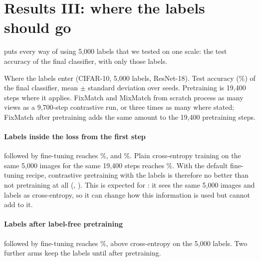 \section{Results III: where the labels should go}
\label{sec:where}

 puts every way of using 5,000 labels that we tested on one scale: the test accuracy of the
final classifier, with only those labels.

\begin{table}[t]
\centering
\small
\caption{Where the labels enter (CIFAR-10, 5,000 labels, ResNet-18). Test accuracy (\%) of the final
classifier, mean $\pm$ standard deviation over seeds. Pretraining is 19,400 steps where it applies.
FixMatch and MixMatch from scratch process as many views as a 9,700-step contrastive run, or three times as
many where stated; FixMatch after pretraining adds the same amount to the 19,400 pretraining steps.}
\label{tab:where}
\begin{adjustbox}{max width=\linewidth}

\end{adjustbox}
\end{table}

\paragraph{Labels inside the loss from the first step}
\supcon followed by fine-tuning reaches \%, and \union
{}\%. Plain cross-entropy training on the same 5,000 images for the same 19,400
steps reaches \%. With the default fine-tuning recipe, contrastive pretraining with
the labels is therefore no better than not pretraining at all
(\pt, ). This is expected for \supcon: it sees the
same 5,000 images and labels as cross-entropy, so it can change how this information is used but cannot add
to it.

\paragraph{Labels after label-free pretraining}
\simclr followed by fine-tuning reaches \%, \pt above
cross-entropy on the 5,000 labels. Two further arms keep the labels until after pretraining.

